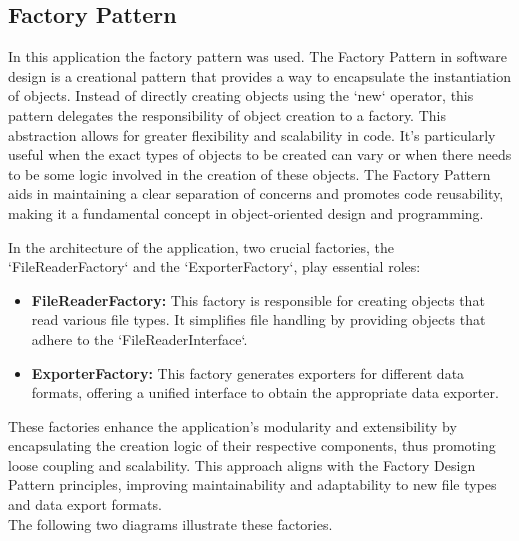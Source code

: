 \subsection{Factory Pattern}
In this application the factory pattern was used.
The Factory Pattern in software design is a creational pattern that provides a way to encapsulate the instantiation of objects. Instead of directly creating objects using the `new` operator, this pattern delegates the responsibility of object creation to a factory. This abstraction allows for greater flexibility and scalability in code. It's particularly useful when the exact types of objects to be created can vary or when there needs to be some logic involved in the creation of these objects. The Factory Pattern aids in maintaining a clear separation of concerns and promotes code reusability, making it a fundamental concept in object-oriented design and programming.

In the architecture of the application, two crucial factories, the `FileReaderFactory` and the `ExporterFactory`, play essential roles:

\begin{itemize}
    \item \textbf{FileReaderFactory:} This factory is responsible for creating objects that read various file types. It simplifies file handling by providing objects that adhere to the `FileReaderInterface`.
    \item \textbf{ExporterFactory:} This factory generates exporters for different data formats, offering a unified interface to obtain the appropriate data exporter.
\end{itemize}

These factories enhance the application's modularity and extensibility by encapsulating the creation logic of their respective components, thus promoting loose coupling and scalability. This approach aligns with the Factory Design Pattern principles, improving maintainability and adaptability to new file types and data export formats. \\

The following two diagrams illustrate these factories.
\clearpage

